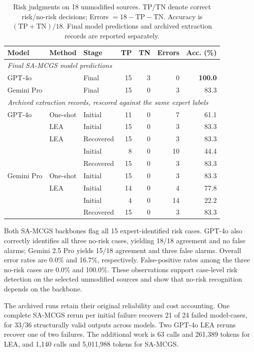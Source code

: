 \begin{revadded}
\begin{table}[!tp]
\centering
\renewcommand{\arraystretch}{1.10}
\small
\setlength{\tabcolsep}{4pt}
\begin{tabular}{lllrrrr}
\toprule
\bfseries Model & \bfseries Method & \bfseries Stage & \bfseries TP & \bfseries TN & \bfseries Errors & \bfseries Acc. (\%) \\
\midrule
\multicolumn{7}{l}{\textit{Final SA-MCGS model predictions}} \\
\rowcolor{TableFocus}
GPT-4o & \textbf{\samcgs{}} & Final & 15 & 3 & 0 & \textbf{100.0} \\
\rowcolor{TableFocus}
Gemini Pro & \textbf{\samcgs{}} & Final & 15 & 0 & 3 & 83.3 \\
\midrule
\multicolumn{7}{l}{\textit{Archived extraction records, rescored against the same expert labels}} \\
GPT-4o & One-shot & Initial & 11 & 0 & 7 & 61.1 \\
 & LEA & Initial & 15 & 0 & 3 & 83.3 \\
 & LEA & Recovered & 15 & 0 & 3 & 83.3 \\
 & \samcgs{} & Initial & 8 & 0 & 10 & 44.4 \\
 & \samcgs{} & Recovered & 15 & 0 & 3 & 83.3 \\
\midrule
Gemini Pro & One-shot & Initial & 15 & 0 & 3 & 83.3 \\
 & LEA & Initial & 14 & 0 & 4 & 77.8 \\
 & \samcgs{} & Initial & 4 & 0 & 14 & 22.2 \\
 & \samcgs{} & Recovered & 15 & 0 & 3 & 83.3 \\
\bottomrule
\end{tabular}
\caption{Risk judgments on 18 unmodified sources. TP/TN denote correct risk/no-risk decisions; Errors $=18-\mathrm{TP}-\mathrm{TN}$. Accuracy is $(\mathrm{TP}+\mathrm{TN})/18$. Final model predictions and archived extraction records are reported separately.}
\label{tab:expert_pre_negative}
\end{table}

Both SA-MCGS backbones flag all 15 expert-identified risk cases. GPT-4o also correctly identifies all three no-risk cases, yielding 18/18 agreement and no false alarms; Gemini 2.5 Pro yields 15/18 agreement and three false alarms. Overall error rates are 0.0\% and 16.7\%, respectively. False-positive rates among the three no-risk cases are 0.0\% and 100.0\%. These observations support case-level risk detection on the selected unmodified sources and show that no-risk recognition depends on the backbone.

The archived runs retain their original reliability and cost accounting. One complete SA-MCGS rerun per initial failure recovers 21 of 24 failed model-cases, for 33/36 structurally valid outputs across models. Two GPT-4o LEA reruns recover one of two failures. The additional work is 63 calls and 261,389 tokens for LEA, and 1,140 calls and 5,011,988 tokens for SA-MCGS.

\end{revadded}

